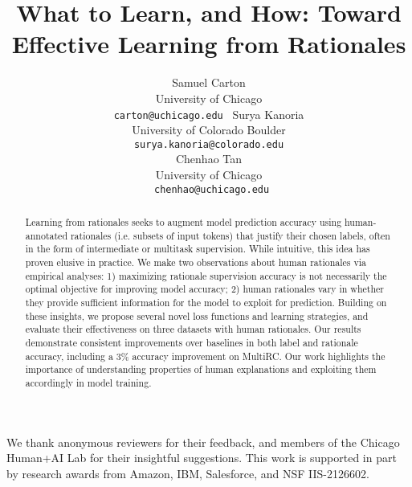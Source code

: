 \documentclass[11pt]{article}
\title{What to Learn, and How: Toward Effective Learning from Rationales}
\author{Samuel Carton\\
  University of Chicago \\
  \texttt{carton@uchicago.edu   }
  \And
  Surya Kanoria\\
  University of Colorado Boulder \\
    \texttt{   surya.kanoria@colorado.edu   } \\

  \AND
  Chenhao Tan \\
  University of Chicago \\ 
  \texttt{   chenhao@uchicago.edu}
  }
\newcommand{\para}[1]{\noindent{\bf #1}\xspace}
\begin{document}
\maketitle
\begin{abstract}


Learning from rationales seeks to augment model prediction accuracy using human-annotated rationales (i.e. subsets of input tokens) that justify their chosen labels, often in the form of intermediate or multitask supervision. While intuitive, this idea has proven elusive in practice. 
We make two observations about human rationales via empirical analyses:
1) maximizing rationale supervision accuracy is not necessarily the optimal objective for improving model accuracy; 
2) human rationales vary in whether they provide sufficient information for the model to exploit for prediction.
Building on these insights, we propose several novel loss functions and learning strategies, and evaluate their effectiveness on three datasets with human rationales. Our results demonstrate consistent improvements over baselines in both label and rationale accuracy, including a 3\% accuracy improvement on MultiRC. Our work highlights the importance of understanding properties of human explanations and exploiting them accordingly in model training.




\end{abstract}









\para{Acknowledgments.}
We thank anonymous reviewers for their feedback, and members of the Chicago Human+AI Lab for their insightful suggestions. 
This work is supported in part by research awards from Amazon, IBM, Salesforce, and NSF IIS-2126602.




\newpage 
\appendix

\end{document}
